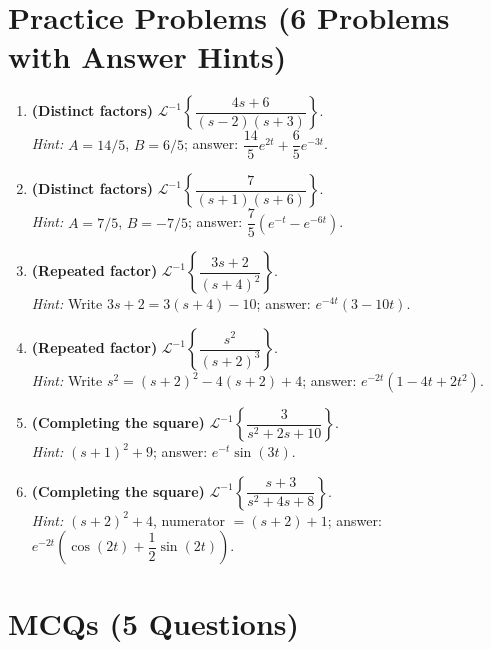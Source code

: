 \documentclass[12pt,a4paper]{article}
\begin{document}
\section{Practice Problems (6 Problems with Answer Hints)}

\begin{enumerate}[leftmargin=*, label=\textbf{P\arabic*.}]

\item \textbf{(Distinct factors)} \;
    $\mathcal{L}^{-1}\!\left\{\dfrac{4s+6}{(s-2)(s+3)}\right\}$.\\
    \textit{Hint:} $A = 14/5$, $B = 6/5$; answer: $\dfrac{14}{5}e^{2t}+\dfrac{6}{5}e^{-3t}$.

\item \textbf{(Distinct factors)} \;
    $\mathcal{L}^{-1}\!\left\{\dfrac{7}{(s+1)(s+6)}\right\}$.\\
    \textit{Hint:} $A = 7/5$, $B = -7/5$; answer: $\dfrac{7}{5}(e^{-t}-e^{-6t})$.

\item \textbf{(Repeated factor)} \;
    $\mathcal{L}^{-1}\!\left\{\dfrac{3s+2}{(s+4)^{2}}\right\}$.\\
    \textit{Hint:} Write $3s+2 = 3(s+4)-10$; answer: $e^{-4t}(3-10t)$.

\item \textbf{(Repeated factor)} \;
    $\mathcal{L}^{-1}\!\left\{\dfrac{s^{2}}{(s+2)^{3}}\right\}$.\\
    \textit{Hint:} Write $s^{2} = (s+2)^{2}-4(s+2)+4$;
    answer: $e^{-2t}\!\left(1-4t+2t^{2}\right)$.

\item \textbf{(Completing the square)} \;
    $\mathcal{L}^{-1}\!\left\{\dfrac{3}{s^{2}+2s+10}\right\}$.\\
    \textit{Hint:} $(s+1)^{2}+9$; answer: $e^{-t}\sin(3t)$.

\item \textbf{(Completing the square)} \;
    $\mathcal{L}^{-1}\!\left\{\dfrac{s+3}{s^{2}+4s+8}\right\}$.\\
    \textit{Hint:} $(s+2)^{2}+4$, numerator $= (s+2)+1$;
    answer: $e^{-2t}\!\left(\cos(2t)+\dfrac{1}{2}\sin(2t)\right)$.

\end{enumerate}

\section{MCQs (5 Questions)}
\end{document}
